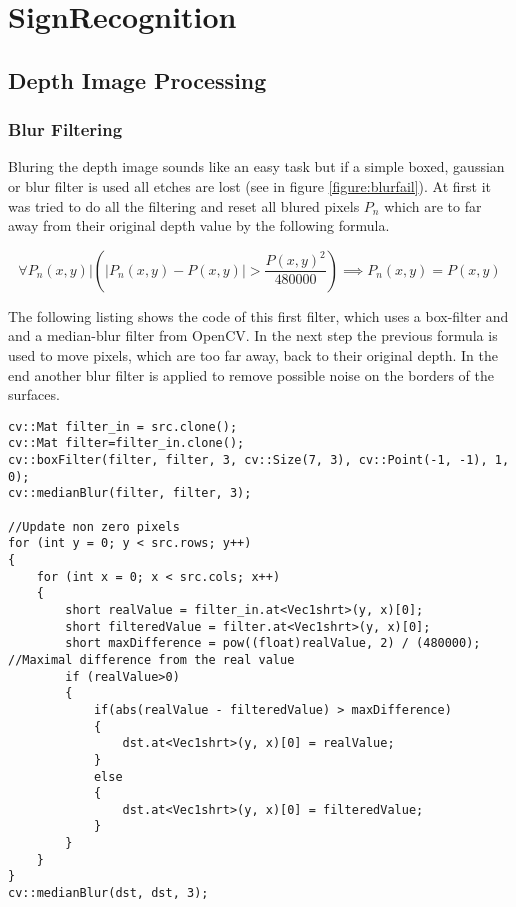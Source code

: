 \chapter{SignRecognition}
\graphicspath{{./Software/img/}}
 
\section{Depth Image Processing}


\subsection{Blur Filtering}
Bluring the depth image sounds like an easy task but 
if a simple boxed, gaussian or blur filter is used all etches are lost (see in figure \vref{figure:blurfail}).
At first it was tried to do all the filtering and reset all blured pixels $P_n$ which are to far away from their 
original depth value by the following formula.

\[
 \forall P_n(x,y)  |   \left(\left|{P_n(x,y)-P(x,y)}\right|>{\frac{P(x,y)^2}{480000}}\right)\implies P_n(x,y)=P(x,y)
\]

The following listing shows the code of this first filter, which uses a box-filter and and a median-blur filter from
OpenCV. In the next step the previous formula is used to move pixels, which are too far away, back to their original depth.
In the end another blur filter is applied to remove possible noise on the borders of the surfaces.

{
\tiny
\newpage
\begin{lstlisting}
cv::Mat filter_in = src.clone();
cv::Mat filter=filter_in.clone();
cv::boxFilter(filter, filter, 3, cv::Size(7, 3), cv::Point(-1, -1), 1, 0);
cv::medianBlur(filter, filter, 3);

//Update non zero pixels
for (int y = 0; y < src.rows; y++)
{
	for (int x = 0; x < src.cols; x++)
	{
		short realValue = filter_in.at<Vec1shrt>(y, x)[0];
		short filteredValue = filter.at<Vec1shrt>(y, x)[0];
		short maxDifference = pow((float)realValue, 2) / (480000); //Maximal difference from the real value
		if (realValue>0)
		{
			if(abs(realValue - filteredValue) > maxDifference)
			{
				dst.at<Vec1shrt>(y, x)[0] = realValue;
			}
			else
			{
				dst.at<Vec1shrt>(y, x)[0] = filteredValue;
			}
		}
	}
}
cv::medianBlur(dst, dst, 3);

\end{lstlisting}
}





